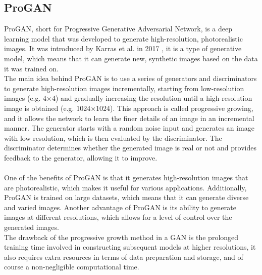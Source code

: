 \subsection{ProGAN}
ProGAN, short for Progressive Generative Adversarial Network, is a deep learning model that was developed to generate high-resolution, photorealistic images. It was introduced by Karras et al. in 2017 \cite{ProGAN}, it is a type of generative model, which means that it can generate new, synthetic images based on the data it was trained on.\\
The main idea behind ProGAN is to use a series of generators and discriminators to generate high-resolution images incrementally, starting from low-resolution images (e.g. 4×4) and gradually increasing the resolution until a high-resolution image is obtained (e.g. 1024×1024). This approach is called progressive growing, and it allows the network to learn the finer details of an image in an incremental manner. The generator starts with a random noise input and generates an image with low resolution, which is then evaluated by the discriminator. The discriminator determines whether the generated image is real or not and provides feedback to the generator, allowing it to improve. \\ \\
One of the benefits of ProGAN is that it generates high-resolution images that are photorealistic, which makes it useful for various applications. Additionally, ProGAN is trained on large datasets, which means that it can generate diverse and varied images.
Another advantage of ProGAN is its ability to generate images at different resolutions, which allows for a level of control over the generated images. \\ The drawback of the progressive growth method in a GAN is the prolonged training time involved in constructing subsequent models at higher resolutions, it also requires extra resources in terms of data preparation and storage, and of course a non-negligible computational time.

